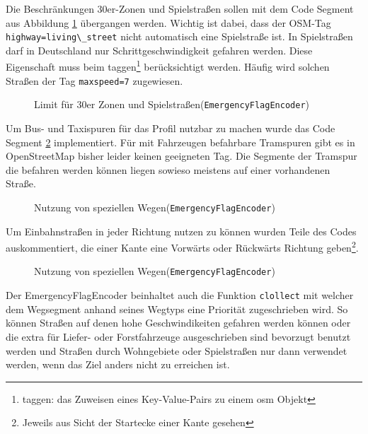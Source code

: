 \documentclass[12pt,a4paper]{article}
\begin{document}
Die Beschränkungen 30er-Zonen und Spielstraßen sollen mit dem Code Segment aus Abbildung \ref{cod:zone} übergangen werden. Wichtig ist dabei, dass der OSM-Tag \lstinline!highway=living\_street! nicht automatisch eine Spielstraße ist. In Spielstraßen darf in Deutschland nur Schrittgeschwindigkeit gefahren werden. Diese Eigenschaft muss beim taggen\footnote{taggen: das Zuweisen eines Key-Value-Pairs zu einem \gls{osm} Objekt} berücksichtigt werden. Häufig wird solchen Straßen der Tag \lstinline!maxspeed=7! zugewiesen.

\begin{figure}[h]

\caption{Limit für 30er Zonen und Spielstraßen(\lstinline!EmergencyFlagEncoder!)}
\label{cod:zone}
\end{figure}

Um Bus- und Taxispuren für das Profil nutzbar zu machen wurde das Code Segment \ref{cod:bus} implementiert. Für mit Fahrzeugen befahrbare Tramspuren gibt es in OpenStreetMap bisher leider keinen geeigneten Tag. Die Segmente der Tramspur die befahren werden können liegen sowieso meistens auf einer vorhandenen Straße.

\begin{figure}[h]

\caption{Nutzung von speziellen Wegen(\lstinline!EmergencyFlagEncoder!)}
\label{cod:bus}
\end{figure}

Um Einbahnstraßen in jeder Richtung nutzen zu können wurden Teile des Codes auskommentiert, die einer Kante eine Vorwärts oder Rückwärts Richtung geben\footnote{Jeweils aus Sicht der Startecke einer Kante gesehen}.

\begin{figure}[h]

\caption{Nutzung von speziellen Wegen(\lstinline!EmergencyFlagEncoder!)}
\label{cod:weight}
\end{figure}

Der EmergencyFlagEncoder beinhaltet auch die Funktion \lstinline!clollect! mit welcher dem Wegsegment anhand seines Wegtyps eine Priorität zugeschrieben wird. So können Straßen auf denen hohe Geschwindikeiten gefahren werden können oder die extra für Liefer- oder Forstfahrzeuge ausgeschrieben sind bevorzugt benutzt werden und Straßen durch Wohngebiete oder Spielstraßen nur dann verwendet werden, wenn das Ziel anders nicht zu erreichen ist.
\end{document}
